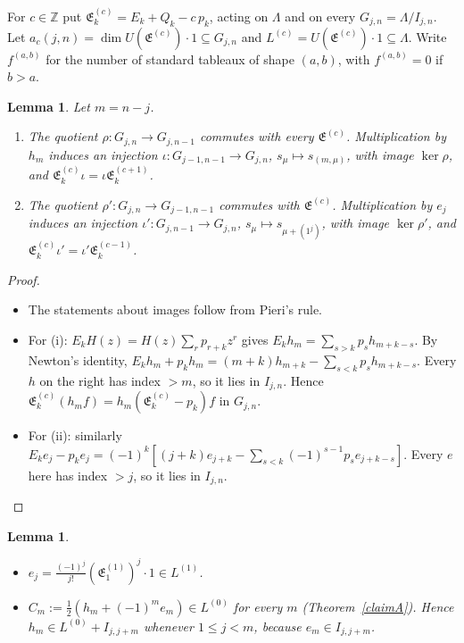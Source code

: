 \documentclass[11pt]{article}
\newtheorem{lemma}[theorem]{Lemma}
\theoremstyle{definition}
\theoremstyle{remark}
\newcommand{\La}{\Lambda}
\newcommand{\fE}{\mathfrak{E}}
\begin{document}
For $c\in\mathbb Z$ put $\fE^{(c)}_k=E_k+Q_k-c\,p_k$, acting on $\La$ and on every $G_{j,n}=\La/I_{j,n}$. Let
$a_c(j,n)=\dim U(\fE^{(c)})\cdot1\subseteq G_{j,n}$ and $L^{(c)}=U(\fE^{(c)})\cdot1\subseteq\La$. Write
$f^{(a,b)}$ for the number of standard tableaux of shape $(a,b)$, with $f^{(a,b)}=0$ if $b>a$.

\begin{lemma}\label{exact}
Let $m=n-j$.
\begin{enumerate}
\item[(i)] The quotient $\rho\colon G_{j,n}\to G_{j,n-1}$ commutes with every $\fE^{(c)}$. Multiplication by
$h_m$ induces an injection $\iota\colon G_{j-1,n-1}\to G_{j,n}$, $s_\mu\mapsto s_{(m,\mu)}$, with image
$\ker\rho$, and $\fE^{(c)}_k\iota=\iota\fE^{(c+1)}_k$.
\item[(ii)] The quotient $\rho'\colon G_{j,n}\to G_{j-1,n-1}$ commutes with $\fE^{(c)}$. Multiplication by $e_j$
induces an injection $\iota'\colon G_{j,n-1}\to G_{j,n}$, $s_\mu\mapsto s_{\mu+(1^j)}$, with image $\ker\rho'$, and
$\fE^{(c)}_k\iota'=\iota'\fE^{(c-1)}_k$.
\end{enumerate}
\end{lemma}

\begin{proof}
\begin{itemize}
\item The statements about images follow from Pieri's rule.
\item For (i): $E_kH(z)=H(z)\sum_rp_{r+k}z^r$ gives $E_kh_m=\sum_{s>k}p_sh_{m+k-s}$. By Newton's identity,
$E_kh_m+p_kh_m=(m+k)h_{m+k}-\sum_{s<k}p_sh_{m+k-s}$. Every $h$ on the right has index $>m$, so it lies in
$I_{j,n}$. Hence $\fE^{(c)}_k(h_mf)=h_m(\fE^{(c)}_k-p_k)f$ in $G_{j,n}$.
\item For (ii): similarly $E_ke_j-p_ke_j=(-1)^k[(j+k)e_{j+k}-\sum_{s<k}(-1)^{s-1}p_se_{j+k-s}]$. Every $e$ here
has index $>j$, so it lies in $I_{j,n}$.
\end{itemize}
\end{proof}

\begin{lemma}\label{members}
\begin{itemize}
\item[(a)] $e_j=\frac{(-1)^j}{j!}(\fE^{(1)}_1)^j\cdot1\in L^{(1)}$.
\item[(b)] $C_m:=\frac12(h_m+(-1)^me_m)\in L^{(0)}$ for every $m$ (Theorem~\ref{claimA}). Hence
$h_m\in L^{(0)}+I_{j,j+m}$ whenever $1\le j<m$, because $e_m\in I_{j,j+m}$.
\end{itemize}
\end{lemma}
\end{document}
